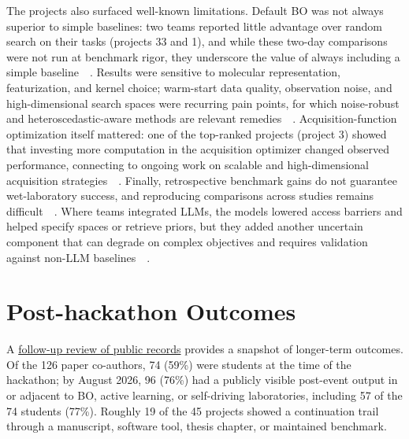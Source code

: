\documentclass[superscriptaddress, nofootinbib,  amsmath, amssymb, twocolumn]{revtex4-2} %
\let\originalcite\cite
\renewcommand{\cite}[1]{\unskip~\originalcite{#1}}
\begin{document}
The projects also surfaced well-known limitations. Default BO was not always superior to simple baselines: two teams reported little advantage over random search on their tasks (projects 33 and 1), and while these two-day comparisons were not run at benchmark rigor, they underscore the value of always including a simple baseline~\cite{liang_benchmarking_2021}. Results were sensitive to molecular representation, featurization, and kernel choice; warm-start data quality, observation noise, and high-dimensional search spaces were recurring pain points, for which noise-robust and heteroscedastic-aware methods are relevant remedies~\cite{aldeghi_golem_2021, altamirano_robust_2023}. Acquisition-function optimization itself mattered: one of the top-ranked projects (project 3) showed that investing more computation in the acquisition optimizer changed observed performance, connecting to ongoing work on scalable and high-dimensional acquisition strategies~\cite{ament_sustainable_2023, maus_local_2023}. Finally, retrospective benchmark gains do not guarantee wet-laboratory success, and reproducing comparisons across studies remains difficult~\cite{liang_benchmarking_2021}. Where teams integrated LLMs, the models lowered access barriers and helped specify spaces or retrieve priors, but they added another uncertain component that can degrade on complex objectives and requires validation against non-LLM baselines~\cite{kristiadi_sober_2024}.

\section{Post-hackathon Outcomes}
\label{sec:outcomes}

A \href{https://github.com/AC-BO-Hackathon/ac-bo-hackathon.github.io/issues/172\#issuecomment-5348017006}{follow-up review of public records} provides a snapshot of longer-term outcomes. Of the 126 paper co-authors, 74 (59\%) were students at the time of the hackathon; by August 2026, 96 (76\%) had a publicly visible post-event output in or adjacent to BO, active learning, or self-driving laboratories, including 57 of the 74 students (77\%). Roughly 19 of the 45 projects showed a continuation trail through a manuscript, software tool, thesis chapter, or maintained benchmark.
\end{document}
